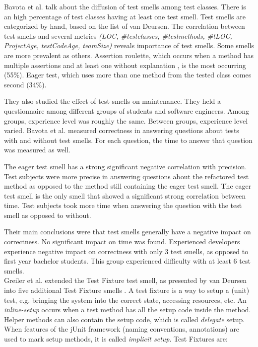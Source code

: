 \documentclass{uvamscse}
\newcommand{\Afixture}{Greiler et al.}
\begin{document}
Bavota et al. \cite{bavota2012empirical} talk about the diffusion of test smells among test classes. There is an high percentage of test classes having at least one test smell. Test smells are categorized by hand, based on the list of van Deursen. The correlation between test smells and several metrics \textit{(LOC, \#testclasses, \#testmethods, \#tLOC, ProjectAge, testCodeAge, teamSize) }reveals importance of test smells. Some smells are more prevalent as others. Assertion roulette, which occurs when a method has multiple assertions and at least one without explanation , is the most occurring (55\%). Eager test, which uses more than one method from the tested class comes second (34\%). 

They also studied the effect of test smells on maintenance. They held a questionnaire among different groups of students and software engineers. Among groups, experience level was roughly the same. Between groups, experience level varied. Bavota et al.  measured correctness in answering questions about tests with and without test smells. For each question, the time to answer that question was measured as well. 

The eager test smell has a strong significant negative correlation with precision. Test subjects were more precise in answering questions about the refactored test method as opposed to the method still containing the eager test smell. The eager test smell is the only smell that showed a significant strong correlation between time. Test subjects took more time when answering the question with the test smell as opposed to without.

Their main conclusions were that test smells generally have a negative impact on correctness. No significant impact on time was found. Experienced developers experience negative impact on correctness with only 3 test smells, as opposed to first year bachelor students. This group experienced difficulty with at least 6 test smells.\\


\Afixture{} extended the Test Fixture test smell, as presented by van Deursen \cite{van2001refactoring} into five additional Test Fixture smells \cite{greiler2013automated}. A test fixture is a way to setup a (unit) test, e.g. bringing the system into the correct state, accessing resources, etc. An \textit{inline-setup} occurs when a test method has all the setup code inside the method. Helper methods can also contain the setup code, which is called \textit{delegate} setup. When features of the jUnit framework (naming conventions, annotations) are used to mark setup methods, it is called \textit{implicit setup}. Test Fixtures are:
\end{document}
